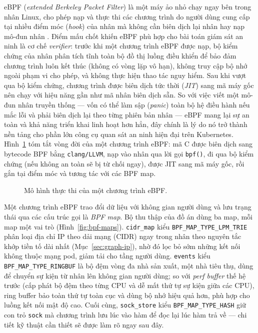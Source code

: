 eBPF (\textit{extended Berkeley Packet Filter}) là một máy ảo nhỏ chạy ngay bên
trong nhân Linux, cho phép nạp và thực thi các chương trình do người dùng cung
cấp tại nhiều điểm móc (\textit{hook}) của nhân mà không cần biên dịch lại nhân
hay nạp mô-đun nhân \cite{gregg2019bpf}. Điểm mấu chốt khiến eBPF phù hợp cho bài
toán giám sát an ninh là cơ chế \textit{verifier}: trước khi một chương trình
eBPF được nạp, bộ kiểm chứng của nhân phân tích tĩnh toàn bộ đồ thị luồng điều
khiển để bảo đảm chương trình luôn kết thúc (không có vòng lặp vô hạn), không
truy cập bộ nhớ ngoài phạm vi cho phép, và không thực hiện thao tác nguy hiểm.
Sau khi vượt qua bộ kiểm chứng, chương trình được biên dịch tức thời (\textit{JIT})
sang mã máy gốc nên chạy với hiệu năng gần như mã nhân biên dịch sẵn. So với việc
viết một mô-đun nhân truyền thống --- vốn có thể làm sập (\textit{panic}) toàn bộ
hệ điều hành nếu mắc lỗi và phải biên dịch lại theo từng phiên bản nhân --- eBPF
mang lại sự an toàn và khả năng triển khai linh hoạt hơn hẳn, đây chính là lý do
nó trở thành nền tảng cho phần lớn công cụ quan sát an ninh hiện đại trên
Kubernetes. Hình~\ref{fig:ebpf-exec} tóm tắt vòng đời của một chương trình eBPF:
mã C được biên dịch sang bytecode BPF bằng \texttt{clang/LLVM}, nạp vào nhân qua
lời gọi \texttt{bpf()}, đi qua bộ kiểm chứng (nếu không an toàn sẽ bị từ chối ngay),
được JIT sang mã máy gốc, rồi gắn tại điểm móc và tương tác với các BPF map.

\begin{figure}[H]
  \centering
  \resizebox{0.9\linewidth}{!}{}
  \caption{Mô hình thực thi của một chương trình eBPF.}
  \label{fig:ebpf-exec}
\end{figure}

Một chương trình eBPF trao đổi dữ liệu với không gian người dùng và lưu trạng thái
qua các cấu trúc gọi là \textit{BPF map}. Bộ thu thập của đồ án dùng ba map, mỗi
map một vai trò (Hình~\ref{fig:bpf-maps}). \texttt{cidr\_map} kiểu
\texttt{BPF\_MAP\_TYPE\_LPM\_TRIE} phân loại địa chỉ IP theo dải mạng (CIDR) ngay
trong nhân theo nguyên tắc khớp tiền tố dài nhất (Mục~\ref{sec:graph-ip}), nhờ đó
lọc bỏ sớm những kết nối không thuộc mạng pod, giảm tải cho tầng người dùng.
\texttt{events} kiểu \texttt{BPF\_MAP\_TYPE\_RINGBUF} là bộ đệm vòng đa nhà sản
xuất, một nhà tiêu thụ, dùng để chuyển sự kiện từ nhân lên không gian người dùng;
so với \textit{perf buffer} thế hệ trước (cấp phát bộ đệm theo từng CPU và dễ mất
thứ tự sự kiện giữa các CPU), ring buffer bảo toàn thứ tự toàn cục và dùng bộ nhớ
hiệu quả hơn, phù hợp cho luồng kết nối mật độ cao. Cuối cùng, \texttt{sock\_store}
kiểu \texttt{BPF\_MAP\_TYPE\_HASH} giữ con trỏ \texttt{sock} mà chương trình lưu
lúc vào hàm để đọc lại lúc hàm trả về --- chi tiết kỹ thuật cần thiết sẽ được làm
rõ ngay sau đây.

